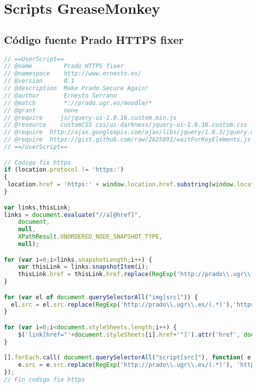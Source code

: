 \newpage
\section{Scripts GreaseMonkey}

\subsection{Código fuente Prado HTTPS fixer}

\begin{lstlisting}[language=javascript]
// ==UserScript==
// @name         Prado HTTPS fixer
// @namespace    http://www.ernesto.es/
// @version      0.1
// @description  Make Prado Secure Again!
// @author       Ernesto Serrano
// @match        *://prado.ugr.es/moodle/*
// @grant        none
// @require     js/jquery-ui-1.8.16.custom.min.js
// @resource    customCSS css/ui-darkness/jquery-ui-1.8.16.custom.css
// @require  http://ajax.googleapis.com/ajax/libs/jquery/1.8.3/jquery.min.js
// @require  https://gist.github.com/raw/2625891/waitForKeyElements.js
// ==/UserScript==

// Codigo fix https
if (location.protocol != 'https:')
{
 location.href = 'https:' + window.location.href.substring(window.location.protocol.length);
}

var links,thisLink;
links = document.evaluate("//a[@href]",
    document,
    null,
    XPathResult.UNORDERED_NODE_SNAPSHOT_TYPE,
    null);

for (var i=0;i<links.snapshotLength;i++) {
    var thisLink = links.snapshotItem(i);
    thisLink.href = thisLink.href.replace(RegExp('http://prado\\.ugr\\.es/(.*)'), 'https://prado.ugr.es/$1');    
}

for (var el of document.querySelectorAll("img[src]")) {
  el.src = el.src.replace(RegExp('http://prado\\.ugr\\.es/(.*)'),'https://prado.ugr.es/$1');
}

for (var i=0;i<document.styleSheets.length;i++) {    
    $('link[href="'+document.styleSheets[i].href+'"]').attr('href', document.styleSheets[i].href.replace(RegExp('http://prado\\.ugr\\.es/(.*)'), 'https://prado.ugr.es/$1'));
}

[].forEach.call( document.querySelectorAll("script[src]"), function( e ) {
    e.src = e.src.replace(RegExp('http://prado\\.ugr\\.es/(.*)'), 'https://prado.ugr.es/$1');
});
// Fin codigo fix https
\end{lstlisting}	


